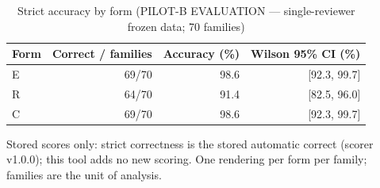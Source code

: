 \begin{table}[t]
\centering
\small
\caption{Strict accuracy by form (PILOT-B EVALUATION --- single-reviewer frozen data; 70 families)}
\label{tab:pilotb-Qwen3-8B-accuracy}
\begin{tabular}{lrrr}
\toprule
Form & Correct / families & Accuracy (\%) & Wilson 95\% CI (\%) \\
\midrule
E & 69/70 & 98.6 & [92.3, 99.7] \\
R & 64/70 & 91.4 & [82.5, 96.0] \\
C & 69/70 & 98.6 & [92.3, 99.7] \\
\bottomrule
\end{tabular}
\par\smallskip
\parbox{\linewidth}{\footnotesize Stored scores only: strict correctness is the stored automatic correct (scorer v1.0.0); this tool adds no new scoring. One rendering per form per family; families are the unit of analysis.}
\end{table}
